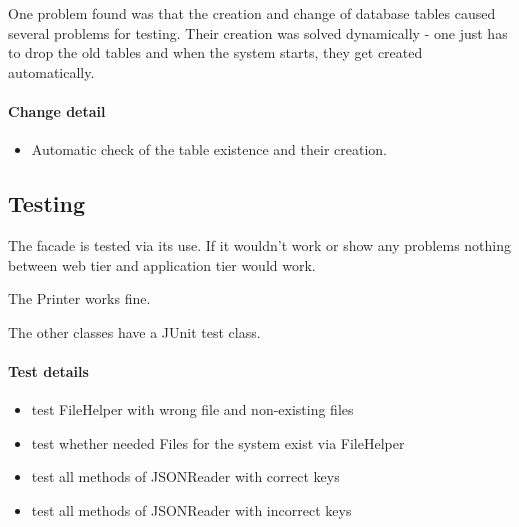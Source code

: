 One problem found was that the creation and change of database tables caused several problems
for testing. Their creation was solved dynamically - one just has to drop the old tables and when the system starts, they get created automatically.

\paragraph{Change detail}
\begin{itemize}
  \item Automatic check of the table existence and their creation.
\end{itemize}


\subsection{Testing}
The facade is tested via its use. If it wouldn't work or show any problems
nothing between web tier and application tier would work.

The Printer works fine.

The other classes have a JUnit test class.
\paragraph{Test details}
\begin{itemize}
  \item test FileHelper with wrong file and non-existing files
  \item test whether needed Files for the system exist via FileHelper
  \item test all methods of JSONReader with correct keys
  \item test all methods of JSONReader with incorrect keys
\end{itemize}




